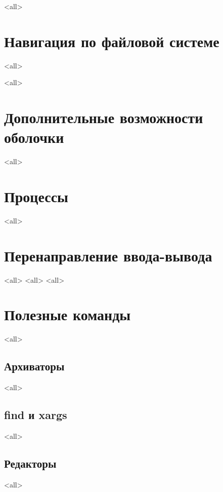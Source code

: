 \mode<all>{}

\section{Навигация по файловой системе}

\mode<all>{}

\mode<all>{}

\section{Дополнительные возможности оболочки}
\mode<all>{}

\section{Процессы}
\mode<all>{}

\section{Перенаправление ввода-вывода}
\mode<all>{}
\mode<all>{}
\mode<all>{}

\section{Полезные команды}

\mode<all>{}

\subsection{Архиваторы}
\mode<all>{}

\subsection{find и xargs}
\mode<all>{}

\subsection{Редакторы}
\mode<all>{}

